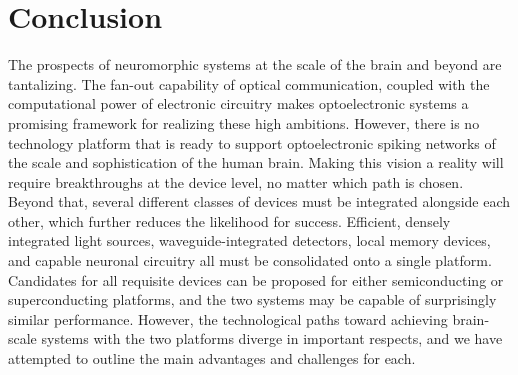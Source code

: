 \documentclass[twocolumn]{article}
\begin{document}
\section{\label{sec:conclusion}Conclusion}
The prospects of neuromorphic systems at the scale of the brain and beyond are tantalizing. The fan-out capability of optical communication, coupled with the computational power of electronic circuitry makes optoelectronic systems a promising framework for realizing these high ambitions. However, there is no technology platform that is ready to support optoelectronic spiking networks of the scale and sophistication of the human brain. Making this vision a reality will require breakthroughs at the device level, no matter which path is chosen. Beyond that, several different classes of devices must be integrated alongside each other, which further reduces the likelihood for success. Efficient, densely integrated light sources, waveguide-integrated detectors, local memory devices, and capable neuronal circuitry all must be consolidated onto a single platform. Candidates for all requisite devices can be proposed for either semiconducting or superconducting platforms, and the two systems may be capable of surprisingly similar performance. However, the technological paths toward achieving brain-scale systems with the two platforms diverge in important respects, and we have attempted to outline the main advantages and challenges for each.
\end{document}
